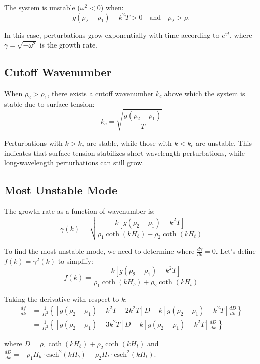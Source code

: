 \documentclass[12pt,a4paper]{article}
\begin{document}
The system is unstable ($\omega^2 < 0$) when:
\begin{equation}
g(\rho_2 - \rho_1) - k^2T > 0 \quad \text{and} \quad \rho_2 > \rho_1
\end{equation}

In this case, perturbations grow exponentially with time according to $e^{\gamma t}$, where $\gamma = \sqrt{-\omega^2}$ is the growth rate.

\subsection{Cutoff Wavenumber}
When $\rho_2 > \rho_1$, there exists a cutoff wavenumber $k_c$ above which the system is stable due to surface tension:
\begin{equation}
k_c = \sqrt{\frac{g(\rho_2 - \rho_1)}{T}}
\end{equation}

Perturbations with $k > k_c$ are stable, while those with $k < k_c$ are unstable. This indicates that surface tension stabilizes short-wavelength perturbations, while long-wavelength perturbations can still grow.

\subsection{Most Unstable Mode}
The growth rate as a function of wavenumber is:
\begin{equation}
\gamma(k) = \sqrt{\frac{k[g(\rho_2 - \rho_1) - k^2T]}{\rho_1\coth(kH_b) + \rho_2\coth(kH_t)}}
\end{equation}

To find the most unstable mode, we need to determine where $\frac{d\gamma}{dk} = 0$. Let's define $f(k) = \gamma^2(k)$ to simplify:
\begin{equation}
f(k) = \frac{k[g(\rho_2 - \rho_1) - k^2T]}{\rho_1\coth(kH_b) + \rho_2\coth(kH_t)}
\end{equation}

Taking the derivative with respect to $k$:
\begin{align}
\frac{df}{dk} &= \frac{1}{D^2}\left\{[g(\rho_2 - \rho_1) - k^2T - 2k^2T]D - k[g(\rho_2 - \rho_1) - k^2T]\frac{dD}{dk}\right\} \\
&= \frac{1}{D^2}\left\{[g(\rho_2 - \rho_1) - 3k^2T]D - k[g(\rho_2 - \rho_1) - k^2T]\frac{dD}{dk}\right\}
\end{align}

where $D = \rho_1\coth(kH_b) + \rho_2\coth(kH_t)$ and $\frac{dD}{dk} = -\rho_1 H_b \cdot \text{csch}^2(kH_b) - \rho_2 H_t \cdot \text{csch}^2(kH_t)$.
\end{document}
